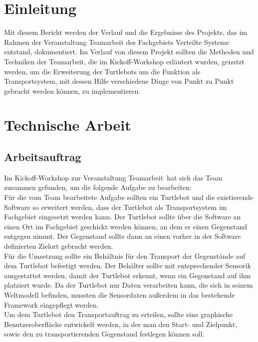\documentclass[a4paper,12pt,headsepline]{scrartcl}
\begin{document}
	\section{Einleitung}
Mit diesem Bericht werden der Verlauf und die Ergebnisse des Projekts, das im Rahmen der Veranstaltung Teamarbeit des Fachgebiets Verteilte Systeme entstand, dokumentiert. Im Verlauf von diesem Projekt sollten die Methoden und Techniken der Teamarbeit, die im Kickoff-Workshop erläutert wurden, genutzt werden, um die Erweiterung der Turtlebots um die Funktion als Transportsystem, mit dessen Hilfe verschiedene Dinge von Punkt zu Punkt gebracht werden können, zu implementieren.	
	\newpage
	\section{Technische Arbeit}
	
	\subsection{Arbeitsauftrag}
		Im Kickoff-Workshop zur Veranstaltung \glqq Teamarbeit\grqq\ hat sich das Team zusammen gefunden, um die folgende Aufgabe zu bearbeiten: \\
		Für die vom Team bearbeitete Aufgabe sollten ein Turtlebot und die existierende Software so erweitert werden, dass der Turtlebot als Transportsystem im Fachgebiet eingesetzt werden kann. Der Turtlebot sollte über die Software an einen Ort im Fachgebiet geschickt werden können, an dem er einen Gegenstand entgegen nimmt. Der Gegenstand sollte dann an einen vorher in der Software definierten Zielort gebracht werden. \\
		Für die Umsetzung sollte ein Behältnis  für den Transport der Gegenstände auf dem Turtlebot befestigt werden. Der Behälter sollte mit entsprechender Sensorik ausgestattet werden, damit der Turtlebot erkennt, wenn ein Gegenstand auf ihm platziert wurde. Da der Turtlebot nur Daten verarbeiten kann, die sich in seinem Weltmodell befinden, mussten die Sensordaten außerdem in das bestehende Framework eingepflegt werden.\\
		Um dem Turtlebot den Transportauftrag zu erteilen, sollte eine graphische Benutzeroberfläche entwickelt werden, in der man den Start- und Zielpunkt, sowie den zu transportierenden Gegenstand festlegen können soll.  

		
	
\end{document}

